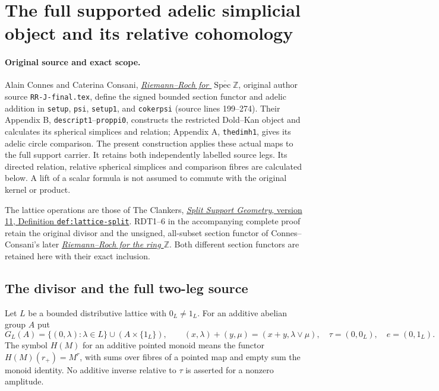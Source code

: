 \section{The full supported adelic simplicial object and its relative cohomology}
\label{sec:supported-adelic-cohomology}

\paragraph{Original source and exact scope.}
Alain Connes and Caterina Consani,
\href{https://arxiv.org/abs/2205.01391v2}{\emph{Riemann--Roch for
$\overline{\operatorname{Spec}\mathbb Z}$}}, original author source
\nolinkurl{RR-J-final.tex}, define the signed bounded section functor and
adelic addition in \texttt{setup}, \texttt{psi}, \texttt{setup1}, and
\texttt{cokerpsi} (source lines 199--274). Their Appendix B,
\texttt{descript1}--\texttt{proppi0}, constructs the restricted
Dold--Kan object and calculates its spherical simplices and relation;
Appendix A, \texttt{thedimh1}, gives its adelic circle comparison.
The present construction applies these actual maps to the full support
carrier. It retains both independently labelled source legs. Its
directed relation, relative spherical simplices and comparison fibres
are calculated below. A lift of a scalar formula is not assumed to
commute with the original kernel or product.

The lattice operations are those of The Clankers,
\href{https://github.com/KokunoYumeto/zeta-function-research-reader/blob/a2851f9eb352e7e4376bc629de86fa4ed9c1c434/workbenches/splitzero-tandem/foundations/split-support-geometry-v11/split_support_geometry_arithmetic_curve_v11.tex#L1226}
{\emph{Split Support Geometry}, version 11, Definition
\texttt{def:lattice-split}}. RDT1--6 in the accompanying complete
proof retain the original divisor and the unsigned, all-subset
section functor of Connes--Consani's later
\href{https://arxiv.org/abs/2306.00456v1}{\emph{Riemann--Roch for
the ring $\mathbb Z$}}. Both different section functors are retained
here with their exact inclusion.

\subsection{The divisor and the full two-leg source}

Let $L$ be a bounded distributive lattice with $0_L\ne1_L$. For an
additive abelian group $A$ put
\begin{equation}\tag{ASC1}
G_L(A)=\{(0,\lambda):\lambda\in L\}\cup(A\times\{1_L\}),\qquad
(x,\lambda)+(y,\mu)=(x+y,\lambda\vee\mu),\quad
\tau=(0,0_L),\quad e=(0,1_L).
\end{equation}
The symbol $H(M)$ for an additive pointed monoid means the functor
$H(M)(r_+)=M^r$, with sums over fibres of a pointed map and empty
sum the monoid identity. No additive inverse relative to $\tau$ is
asserted for a nonzero amplitude.

